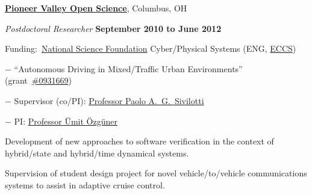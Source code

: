 \documentclass[10pt]{article}
\newcommand{\halfblankline}{\quad\vspace{-0.5\baselineskip}\pagebreak[3]}
\begin{document}
\halfblankline



\href{http://www.osu.edu/}{\textbf{Pioneer Valley Open Science}},
Columbus, OH
\begin{outerlist}

    \item[] \textit{Postdoctoral Researcher}%
            \hfill \textbf{September 2010 to June 2012}
            \begin{innerlist}
                \item Funding:~\href{http://www.nfs.gov/}{National Science Foundation} Cyber\-/Physical Systems (ENG, \href{http://www.nsf.gov/div/index.jsp?div=eccs}{ECCS})
                \begin{innerlist}
                    \item[$-$] ``Autonomous Driving in Mixed\-/Traffic Urban Environments''
                        (grant~\href{http://www.nsf.gov/awardsearch/showAward.do?AwardNumber=0931669}{\#0931669})
                    \item[$-$] Supervisor (co\-/PI):
                        \href{http://www.cse.ohio-state.edu/~paolo/}%
                             {Professor Paolo A.~G.~Sivilotti}
                    \item[$-$] PI:
                        \href{http://www.ece.ohio-state.edu/~umit/}%
                             {Professor \"{U}mit \"{O}zg\"{u}ner}
                \end{innerlist}

                \item Development of new approaches to software
                    verification in the context of hybrid\-/state and
                    hybrid\-/time dynamical systems.

                \item Supervision of student design project for
                    novel vehicle\-/to\-/vehicle communications
                    systems to assist in adaptive cruise control.
            \end{innerlist}

\end{outerlist}

\halfblankline
\end{document}
